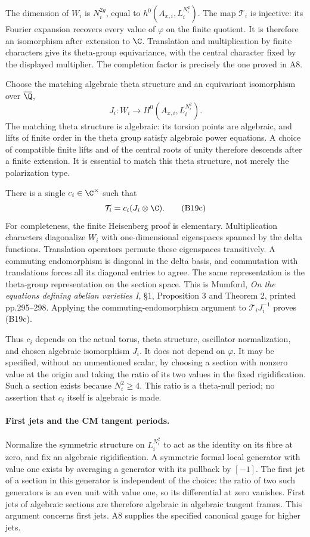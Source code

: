 The dimension of $W_i$ is $N_i^{2g}$, equal to
$h^0(A_{x,i},L_i^{N_i^2})$.  The map $\mathcal T_i$ is injective:
its Fourier expansion recovers every value of $\varphi$ on the
finite quotient.  It is therefore an isomorphism after extension
to $\C$.  Translation and multiplication by finite characters
give its theta-group equivariance, with the central character
fixed by the displayed multiplier.  The completion factor is
precisely the one proved in A8.

Choose the matching algebraic theta structure and an equivariant
isomorphism over $\overline\Q$,
\[
 J_i:W_i\longrightarrow
       H^0(A_{x,i},L_i^{N_i^2}).
\]
The matching theta structure is algebraic: its torsion points are
algebraic, and lifts of finite order in the theta group satisfy
algebraic power equations.  A choice of compatible finite lifts
and of the central roots of unity therefore descends after a
finite extension.  It is essential to match this theta structure,
not merely the polarization type.

There is a single $c_i\in\C^\times$ such that
\begin{equation}\label{B19-Heis}
                 \mathcal T_i=c_i(J_i\otimes\C).
                 \tag{B19c}
\end{equation}
For completeness, the finite Heisenberg proof is elementary.
Multiplication characters diagonalize $W_i$ with one-dimensional
eigenspaces spanned by the delta functions.  Translation operators
permute these eigenspaces transitively.  A commuting endomorphism
is diagonal in the delta basis, and commutation with translations
forces all its diagonal entries to agree.  The same representation
is the theta-group representation on the section space.  This is
Mumford, \emph{On the equations defining abelian varieties I},
\S1, Proposition 3 and Theorem 2, printed pp.295--298.
Applying the commuting-endomorphism argument to
$\mathcal T_iJ_i^{-1}$ proves (B19c).

Thus $c_i$ depends on the actual torus, theta structure, oscillator
normalization, and chosen algebraic isomorphism $J_i$.  It does
not depend on $\varphi$.  It may be specified, without an
unmentioned scalar, by choosing a section with nonzero value at
the origin and taking the ratio of its two values in the fixed
rigidification.  Such a section exists because $N_i^2\geq4$.
This ratio is a theta-null period; no assertion that $c_i$ itself
is algebraic is made.

\paragraph{First jets and the CM tangent periods.}
Normalize the symmetric structure on $L_i^{N_i^2}$ to act as the
identity on its fibre at zero, and fix an algebraic rigidification.
A symmetric formal local generator with value one exists by
averaging a generator with its pullback by $[-1]$.  The first jet
of a section in this generator is independent of the choice:
the ratio of two such generators is an even unit with value one,
so its differential at zero vanishes.  First jets of algebraic
sections are therefore algebraic in algebraic tangent frames.
This argument concerns first jets.  A8 supplies the specified
canonical gauge for higher jets.

